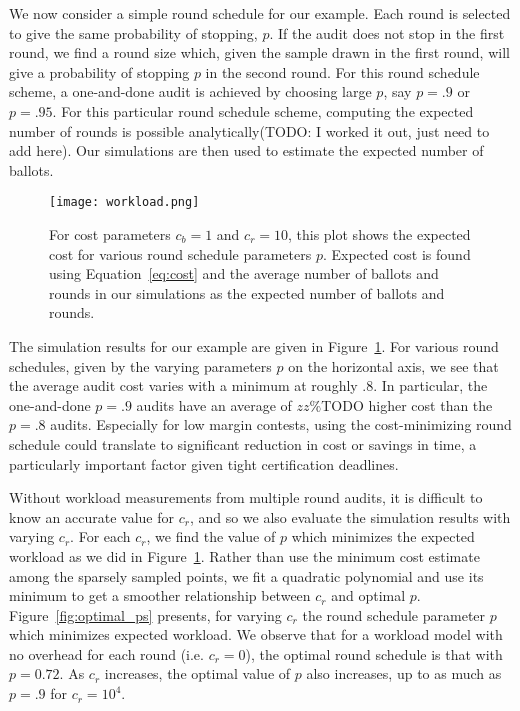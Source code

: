 We now consider a simple round schedule for our example. Each round is selected to give the same probability of stopping, $p$. If the audit does not stop in the first round, we find a round size which, given the sample drawn in the first round, will give a probability of stopping $p$ in the second round. For this round schedule scheme, a one-and-done audit is achieved by choosing large $p$, say $p=.9$ or $p=.95$. For this particular round schedule scheme, computing the expected number of rounds is possible analytically(TODO: I worked it out, just need to add here). Our simulations are then used to estimate the expected number of ballots.

\begin{figure}
\texttt{[image: workload.png]}
\caption{For cost parameters $c_b=1$ and $c_r=10$, this plot shows the expected cost for various round schedule parameters $p$. Expected cost is found using Equation~\ref{eq:cost} and the average number of ballots and rounds in our simulations as the expected number of ballots and rounds.}
\label{fig:workload}
\end{figure}

The simulation results for our example are given in Figure~\ref{fig:workload}. 
For various round schedules, given by the varying parameters $p$ on the horizontal axis, we see that the average audit cost varies with a minimum at roughly $.8$. In particular, the one-and-done $p=.9$ audits have an average of $zz\%$TODO higher cost than the $p=.8$ audits. Especially for low margin contests, using the cost-minimizing round schedule could translate to significant reduction in cost or savings in time, a particularly important factor given tight certification deadlines.

Without workload measurements from multiple round audits, it is difficult to know an accurate value for $c_r$, and so we also evaluate the simulation results with varying $c_r$. 
For each $c_r$, we find the value of $p$ which minimizes the expected workload as we did in Figure~\ref{fig:workload}. Rather than use the minimum cost estimate among the sparsely sampled points, we fit a quadratic polynomial and use its minimum to get a smoother relationship between $c_r$ and optimal $p$. Figure~\ref{fig:optimal_ps} presents, for varying $c_r$ the round schedule parameter $p$ which minimizes expected workload. 
We observe that for a workload model with no overhead for each round (i.e. $c_r=0$), the optimal round schedule is that with $p=0.72$. As $c_r$ increases, the optimal value of $p$ also increases, up to as much as $p=.9$ for $c_r=10^4$.

